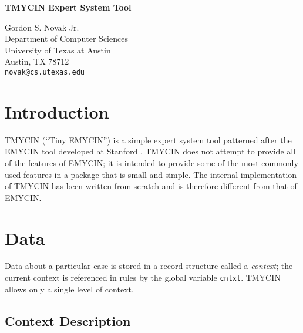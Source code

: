 
\setlength{\oddsidemargin}{0 in}
\setlength{\textwidth}{6.5 in}
\setlength{\textheight}{9.0 in}
\setlength{\parskip}{0.1 in}
\setlength{\parindent}{0.0 in}
\setlength{\topmargin}{-0.4in}



\begin{center}\Large{{\bf TMYCIN Expert System Tool}} \\

\vspace*{0.1in}

\large{Gordon S. Novak Jr. \\
Department of Computer Sciences \\
University of Texas at Austin \\
Austin, TX  78712} \\
{\tt novak@cs.utexas.edu} \\
\end{center}

\vspace*{-0.2in}

\section{Introduction}

TMYCIN (``Tiny EMYCIN'') is a simple expert system tool patterned after
the EMYCIN tool developed at Stanford \cite{MYCIN} \cite{Emycin}.
TMYCIN does not attempt to provide all of the features of EMYCIN; it is
intended to provide some of the most commonly used features in a package
that is small and simple.  The internal implementation of TMYCIN has been
written from scratch and is therefore different from that of EMYCIN.

\section{Data}

Data about a particular case is stored in a record structure called a
{\em context}; the current context is referenced in rules by the global
variable {\tt cntxt}.  TMYCIN allows only a single level of context.

\subsection{Context Description}


